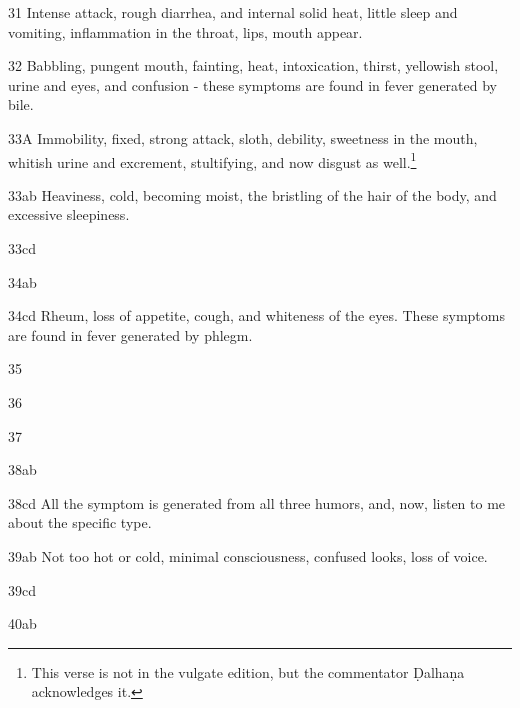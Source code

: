 \begin{translation}
    \item[31]  Intense attack, rough diarrhea, and internal solid heat, little
    sleep and vomiting, inflammation in the throat, lips, mouth appear.
    
    
    \item[32]  Babbling, pungent mouth, fainting, heat, intoxication, thirst,
    yellowish stool, urine and eyes, and confusion - these symptoms are
    found in fever generated by bile.
    
    \item[33A]  Immobility, fixed, strong attack, sloth, debility, sweetness in the
    mouth, whitish urine and excrement, stultifying, and now disgust as
    well.\footnote{
        This verse is not in the vulgate edition, but the commentator Ḍalhaṇa
        acknowledges it.
    }
    
    
    \item[33ab]  Heaviness, cold, becoming moist, the bristling of the hair of the
    body, and excessive sleepiness.
    
   \item[33cd]  
    
   \item[34ab]  
    
    \item[34cd]  Rheum, loss of appetite, cough, and whiteness of the eyes. 
These
    symptoms are found in fever generated by phlegm.
    
   \item[35]  
    
   \item[36]  
    
   \item[37]  
    
   \item[38ab]  
    
    \item[38cd]  All the symptom is generated from all three humors, and, now,
    listen to me about the specific type.
    
    \item[39ab]  Not too hot or cold, minimal consciousness, confused looks, loss
    of voice.
    
   \item[39cd]  
    
    
   \item[40ab]  
    

\end{translation}
